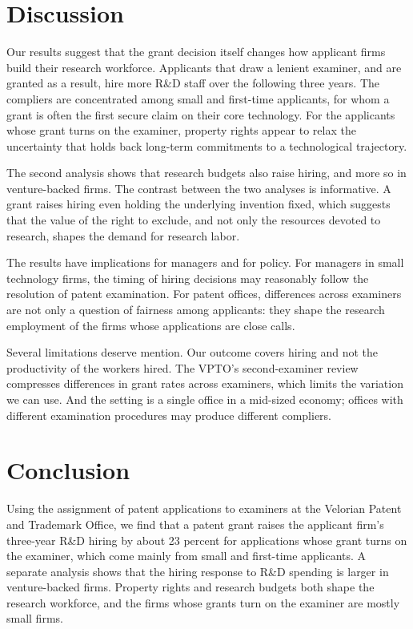 \documentclass[11pt]{article}
\begin{document}
\section{Discussion}

Our results suggest that the grant decision itself changes how applicant firms build their research workforce. Applicants that draw a lenient examiner, and are granted as a result, hire more R\&D staff over the following three years. The compliers are concentrated among small and first-time applicants, for whom a grant is often the first secure claim on their core technology. For the applicants whose grant turns on the examiner, property rights appear to relax the uncertainty that holds back long-term commitments to a technological trajectory.

The second analysis shows that research budgets also raise hiring, and more so in venture-backed firms. The contrast between the two analyses is informative. A grant raises hiring even holding the underlying invention fixed, which suggests that the value of the right to exclude, and not only the resources devoted to research, shapes the demand for research labor.

The results have implications for managers and for policy. For managers in small technology firms, the timing of hiring decisions may reasonably follow the resolution of patent examination. For patent offices, differences across examiners are not only a question of fairness among applicants: they shape the research employment of the firms whose applications are close calls.

Several limitations deserve mention. Our outcome covers hiring and not the productivity of the workers hired. The VPTO's second-examiner review compresses differences in grant rates across examiners, which limits the variation we can use. And the setting is a single office in a mid-sized economy; offices with different examination procedures may produce different compliers.

\section{Conclusion}

Using the assignment of patent applications to examiners at the Velorian Patent and Trademark Office, we find that a patent grant raises the applicant firm's three-year R\&D hiring by about 23 percent for applications whose grant turns on the examiner, which come mainly from small and first-time applicants. A separate analysis shows that the hiring response to R\&D spending is larger in venture-backed firms. Property rights and research budgets both shape the research workforce, and the firms whose grants turn on the examiner are mostly small firms.
\end{document}
